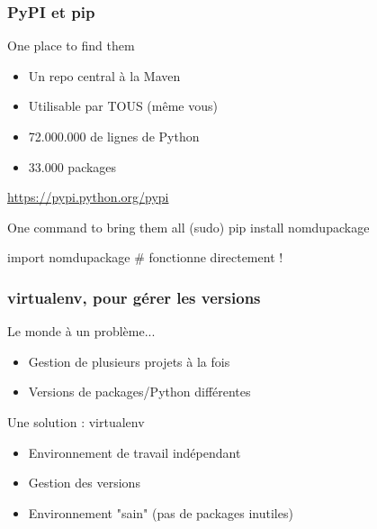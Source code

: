 \documentclass{beamer}
\begin{document}
\begin{frame}[fragile]
  \frametitle{PyPI et pip}
  \begin{block}{One place to find them}
    \begin{itemize}
    \item Un repo central à la Maven
    \item Utilisable par TOUS (même vous)
    \item 72.000.000 de lignes de Python
    \item 33.000 packages
    \end{itemize}
    \centering
    \url{https://pypi.python.org/pypi}
  \end{block}

  \begin{block}{One command to bring them all}
    (sudo) pip install nomdupackage

    \begin{python}
import nomdupackage # fonctionne directement !
    \end{python}
  \end{block}
\end{frame}

\begin{frame}
  \frametitle{virtualenv, pour gérer les versions}

  \begin{block}{Le monde à un problème...}
    \begin{itemize}
    \item Gestion de plusieurs projets à la fois
    \item Versions de packages/Python différentes
    \end{itemize}
  \end{block}

  \begin{block}{Une solution : virtualenv}
    \begin{itemize}
    \item Environnement de travail indépendant
    \item Gestion des versions
    \item Environnement "sain" (pas de packages inutiles)
    \end{itemize}
  \end{block}
\end{frame}
\end{document}
